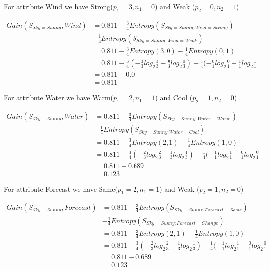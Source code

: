 \documentclass[10pt,a4paper]{article}
\begin{document}
{{{{{{{{{{For attribute Wind we have Strong($p_1=3,n_1=0$) and Weak ($p_2=0,n_2=1$)

\begin{equation}
\begin{split}
Gain(S_{Sky=Sunny},Wind) &= 0.811 - \frac{3}{4} Entropy(S_{Sky=Sunny;Wind=Strong} )\\
                                      &-\frac{1}{4}Entropy(S_{Sky=Sunny;Wind=Weak})\\
          &= 0.811 - \frac{3}{4} Entropy(3,0) - \frac{1}{4}Entropy(0,1) \\
          &= 0.811 - \frac{3}{4}( -\frac{3}{3} log_2\frac{3}{3} -\frac{0}{3} log_2\frac{0}{3} ) 
                   - \frac{1}{4}( -\frac{0}{1} log_2\frac{0}{1} -\frac{1}{1} log_2\frac{1}{1} \\
          &= 0.811 - 0.0  \\
          &= 0.811
\end{split}
\end{equation}

For attribute Water we have Warm($p_1=2,n_1=1$) and Cool ($p_2=1,n_2=0$)

\begin{equation}
\begin{split}
Gain(S_{Sky=Sunny},Water) &= 0.811 - \frac{3}{4} Entropy(S_{Sky=Sunny;Water=Warm} )\\
                                      &-\frac{1}{4}Entropy(S_{Sky=Sunny;Water=Cool})\\
          &= 0.811 - \frac{3}{4} Entropy(2,1) - \frac{1}{4}Entropy(1,0) \\
          &= 0.811 - \frac{3}{4}( -\frac{2}{3} log_2\frac{2}{3} -\frac{1}{3} log_2\frac{1}{3} ) 
                   - \frac{1}{4}( -\frac{1}{1} log_2\frac{1}{1} -\frac{0}{1} log_2\frac{0}{1} \\
          &= 0.811 - 0.689  \\
          &= 0.123
\end{split}
\end{equation}

For attribute Forecast we have Same($p_1=2,n_1=1$) and Weak ($p_2=1,n_2=0$)

\begin{equation}
\begin{split}
Gain(S_{Sky=Sunny},Forecast) &= 0.811 - \frac{3}{4} Entropy(S_{Sky=Sunny;Forecast=Same} )\\
                                      &-\frac{1}{4}Entropy(S_{Sky=Sunny;Forecast=Change})\\
          &= 0.811 - \frac{3}{4} Entropy(2,1) - \frac{1}{4}Entropy(1,0) \\
          &= 0.811 - \frac{3}{4}( -\frac{2}{3} log_2\frac{2}{3} -\frac{1}{3} log_2\frac{1}{3} ) 
                   - \frac{1}{4}( -\frac{1}{1} log_2\frac{1}{1} -\frac{0}{1} log_2\frac{0}{1} \\
          &= 0.811 - 0.689  \\
          &= 0.123
\end{split}
\end{equation}

}}}}}}}}}}
\end{document}
